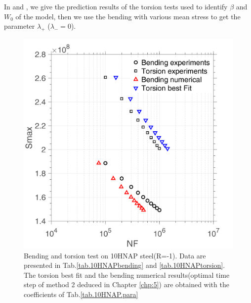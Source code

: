 In  and , we give the prediction results of the torsion tests used to identify $\beta$ and $W_0$ of the model, then we use the bending with various mean stress to get the parameter $\lambda_+$ ($\lambda_-=0$). 
\begin{figure}[!h]
	\centering
	\includegraphics[width=\textwidth]{figures//10HNAP_bt1D_sn.png} 
	\caption{Bending and torsion test on 10HNAP steel(R=-1). Data are presented in Tab.\ref{tab.10HNAPbending} and  \ref{tab.10HNAPtorsion}. The torsion best fit and the bending numerical results(optimal time step of method 2 deduced in Chapter \ref{chp:5}) are obtained with the coefficients of Tab.\ref{tab.10HNAP.para}}
	\label{fig.bt1D10HNAPsn}
\end{figure}
